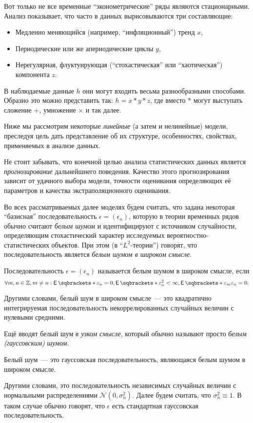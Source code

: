Вот только не все временные ``эконометрические'' ряды являются стационарными. 
Анализ показывает, что часто в данных вырисовываются три составляющие:
\begin{itemize}
	\item Медленно меняющийся (например, ``инфляционный'') тренд \(x\),
	\item Периодические или же апериодические циклы \(y\),
	\item Нерегулярная, флуктуирующая (``стохастическая'' или ``хаотическая'') 
	компонента \(z\).
\end{itemize}
В наблюдаемые данные \(h\) они могут входить весьма разнообразными способами. 
Образно это можно представить так: \(h = x * y * z\), где вместо \(*\) могут 
выступать сложение \(+\), умножение \(\times\) и так далее.

Ниже мы рассмотрим некоторые \emph{линейные} (а затем и нелинейные) модели, 
преследуя цель дать представление об их структуре, особенностях, свойствах, 
применяемых в анализе данных. 

Не стоит забывать, что конечной целью анализа статистических данных является 
\emph{прогнозирование} дальнейшнего поведения. Качество этого прогнозирования 
зависит от удачного выбора модели, точности оценивания определяющих её 
параметров и качества экстраполяционного оценивания.

Во всех рассматриваемых далее моделях будем считать, что задана некоторая 
``базисная'' последовательность \(\epsilon = (\epsilon_{n})\), которую в теории 
временных рядов обычно считают \emph{белым шумом} и идентифицируют с источником 
случайности, определяющим стохастический характер исследуемых 
вероятностно-статистических объектов. При этом (в ``\(L^{2}\)-теории'') 
говорят, что последовательность является \emph{белым шумом в широком смысле}. 
\begin{definition}
	Последовательность \(\epsilon = (\epsilon_{n})\) называется белым шумом в 
	широком смысле, если 
	\[
		\forall m, n \in \Z, m \neq n : \E{\epsilon_{n}} = 0, 
		\E{\epsilon_{n}^{2}} 
		< \infty, \E{\epsilon_{m}\epsilon_{n}} = 0.
	\]
	
	Другими словами, белый шум в широком смысле~--- это квадратично 
	интегрируемая последовательность некоррелированных случайных величин с 
	нулевыми средними.
\end{definition}
Ещё вводят белый шум \emph{в узком смысле}, который обычно называют просто 
\emph{белым (гауссовским) шумом}. 
\begin{definition}
	Белый шум~--- это гауссовская последовательность, являющаяся белым шумом в 
	широком смысле.
\end{definition}
Другими словами, это последовательность независимых случайных величин с 
нормальными распределениями \(\mathcal{N}(0, \sigma_{n}^{2})\). Далее будем 
считать, что \(\sigma_{n}^{2} \equiv 1\). В таком случае обычно говорят, что 
\(\epsilon\) есть стандартная гауссовская последовательность.

